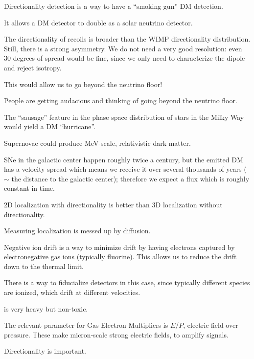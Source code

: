 \documentclass[main.tex]{subfiles}
\begin{document}

Directionality detection is a way to have a ``smoking gun'' DM detection. 

It allows a DM detector to double as a solar neutrino detector. 

The directionality of recoils is broader than the WIMP directionality distribution. 
Still, there is a strong asymmetry. 
We do not need a very good resolution: even 30 degrees of spread would be fine, since 
we only need to characterize the dipole and reject isotropy. 

This would allow us to go beyond the neutrino floor! 

People are getting audacious and thinking of going beyond the neutrino floor. 

The ``sausage'' feature in the phase space distribution of stars
in the Milky Way would yield a DM ``hurricane''. 

Supernovae could produce MeV-scale, relativistic dark matter.

SNe in the galactic center happen roughly twice a century, but 
the emitted DM has a velocity spread which means we receive it over several thousands
of years (\(\sim\) the distance to the galactic center); therefore
we expect a flux which is roughly constant in time. 

2D localization with directionality is better than 3D localization without directionality. 

Measuring localization is messed up by diffusion. 

Negative ion drift is a way to minimize drift by having electrons captured by 
electronegative gas ions (typically fluorine). 
This allows us to reduce the drift down to the thermal limit. 

There is a way to fiducialize detectors in this case, 
since typically different species are ionized, which drift at different velocities. 

 is very heavy but non-toxic. 

The relevant parameter for Gas Electron Multipliers is \(E / P\), electric field
over pressure. 
These make micron-scale strong electric fields, to amplify signals. 

Directionality is important.
\end{document}
